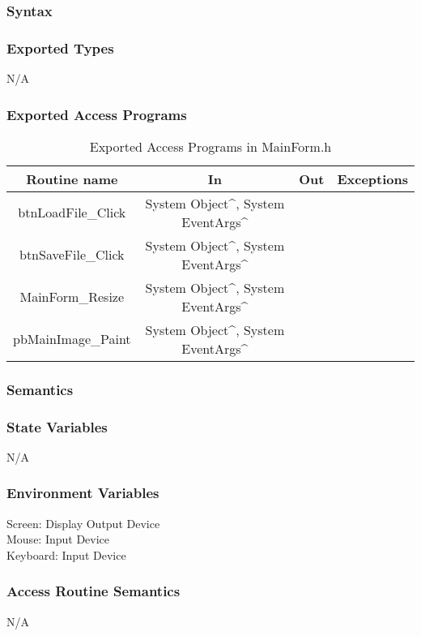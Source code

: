 \documentclass{article}
\begin{document}
\subsubsection* {Syntax}
\subsubsection* {Exported Types}
N/A

\subsubsection* {Exported Access Programs}
\begin{table}[h!]
  \centering
  \caption{Exported Access Programs in MainForm.h}
  \begin{tabular}{|c|c|c|c|}
    \hline
    Routine name & In & Out & Exceptions \\
    \hline
    btnLoadFile\_Click & System Object\^{}, System EventArgs\^{} & & \\
    \hline
    btnSaveFile\_Click & System Object\^{}, System EventArgs\^{} & & \\
    \hline
    MainForm\_Resize & System Object\^{}, System EventArgs\^{} & & \\
    \hline
    pbMainImage\_Paint & System Object\^{}, System EventArgs\^{} & & \\ 
    \hline
  \end{tabular}
\end{table}

\subsubsection* {Semantics}
\subsubsection* {State Variables}
N/A
\subsubsection* {Environment Variables}
Screen: Display Output Device \\
Mouse: Input Device \\
Keyboard: Input Device

\subsubsection*{Access Routine Semantics}
N/A

\newpage
\end{document}
